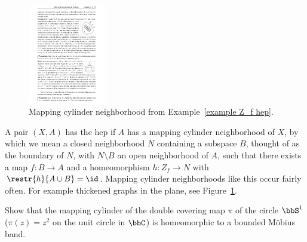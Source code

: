 \begin{figure}
    \centering
    \includegraphics[width=0.3\textwidth]{figures/hep_example.pdf}
    \caption{Mapping cylinder neighborhood from Example~\ref{example Z_f hep}.}
    \label{fig: Z_f hep}
\end{figure}
\begin{example}\label{example Z_f hep}
    A pair $(X,A)$ has the \gls{hep} if $A$ has a mapping cylinder neighborhood of $X$, by which we mean a closed neighborhood $N$ containing a subspace $B$, thought of as the boundary of $N$, with $N\setminus B$ an open neighborhood of $A$, such that there exists a map $f:B\to A$ and a homeomorphism $h:Z_f\to N$ with $\restr{h}{A\cup B}=\id$. Mapping cylinder neighborhoods like this occur fairly often. For example thickened graphs in the plane, see Figure~\ref{fig: Z_f hep}.
\end{example}

\begin{xca}
    Show that the mapping cylinder of the double covering map $\pi$ of the circle $\bbS^1$ ($\pi(z)=z^2$ on the unit circle in $\bbC$) is homeomorphic to a bounded M\"obius band.
\end{xca}


